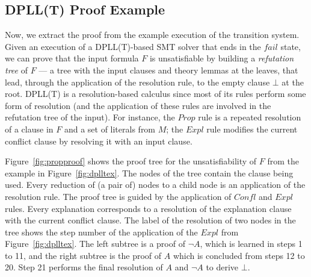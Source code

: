 \documentclass{article}
\begin{document}
	\subsection{DPLL(T) Proof Example}
	\label{sec:proofex}
	Now, we extract the proof from the 
	example execution of the transition system.
	Given an execution of a DPLL(T)-based 
	SMT solver that ends in the $fail$ state, 
	we can prove that the input formula 
	$F$ is unsatisfiable by building a 
	\textit{refutation tree} of $F$ --- a 
	tree with the input clauses 
	and theory lemmas at the leaves, 
	that lead, through the application of 
	the resolution rule, to the empty 
	clause $\bot$ at the root. DPLL(T) is 
	a resolution-based calculus since most 
	of its rules perform some form of 
	resolution (and the application of 
	these rules are involved in the 
	refutation tree of the input). For 
	instance, the $Prop$ rule is a 
	repeated resolution of a clause in 
	$F$ and a set of literals from $M$; 
	the $Expl$ rule modifies the current 
	conflict clause by resolving it with 
	an input clause.
	
	Figure~\ref{fig:propproof} shows the 
	proof tree for the unsatisfiability of 
	$F$ from the example in 
	Figure~\ref{fig:dplltex}. The nodes of 
	the tree contain the clause being 
	used. Every reduction of 
	(a pair of) nodes to a child node 
	is an application of the resolution 
	rule. The proof tree is guided by 
	the application of $Confl$ and $Expl$ 
	rules. Every explanation corresponds 
	to a resolution of the explanation
	clause with the current 
	conflict clause. The label 
	of the resolution of two 
	nodes in the tree shows the 
	step number of the application 
	of the $Expl$ from 
	Figure~\ref{fig:dplltex}.
	The left subtree is a proof of 
	$\neg A$, which is learned in steps 
	1 to 11, and the right subtree is the 
	proof of $A$ which is concluded from 
	steps 12 to 20. Step 21 performs 
	the final resolution of $A$ and 
	$\neg A$ to derive $\bot$.
	
\end{document}
